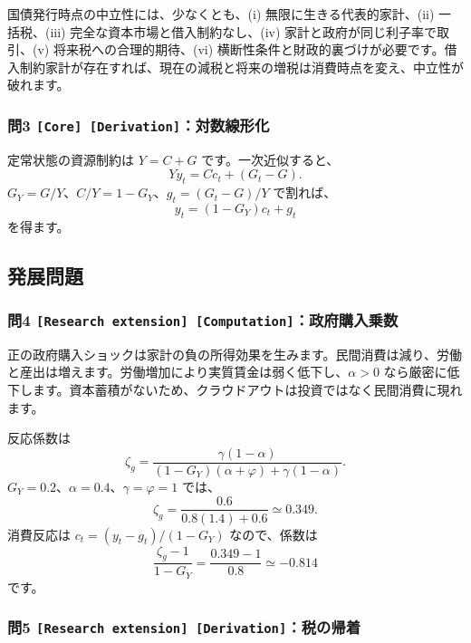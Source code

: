 \documentclass[
  japanese,
  lualatex,
  ja=standard,
  11pt,
  a4paper]{ltjsarticle}
\begin{document}
国債発行時点の中立性には、少なくとも、(i) 無限に生きる代表的家計、(ii)
一括税、(iii) 完全な資本市場と借入制約なし、(iv)
家計と政府が同じ利子率で取引、(v) 将来税への合理的期待、(vi)
横断性条件と財政的裏づけが必要です。借入制約家計が存在すれば、現在の減税と将来の増税は消費時点を変え、中立性が破れます。

\subsubsection{\texorpdfstring{問3
\texttt{{[}Core{]}\ {[}Derivation{]}}：対数線形化}{問3 {[}Core{]} {[}Derivation{]}：対数線形化}}\label{ux554f3-core-derivationux5bfeux6570ux7ddaux5f62ux5316}

定常状態の資源制約は \(Y=C+G\) です。一次近似すると、 \[
Yy_t=Cc_t+(G_t-G).
\] \(G_Y=G/Y\)、\(C/Y=1-G_Y\)、\(g_t=(G_t-G)/Y\) で割れば、 \[
y_t=(1-G_Y)c_t+g_t
\] を得ます。

\subsection{発展問題}\label{ux767aux5c55ux554fux984c-4}

\subsubsection{\texorpdfstring{問4
\texttt{{[}Research\ extension{]}\ {[}Computation{]}}：政府購入乗数}{問4 {[}Research extension{]} {[}Computation{]}：政府購入乗数}}\label{ux554f4-research-extension-computationux653fux5e9cux8cfcux5165ux4e57ux6570}

正の政府購入ショックは家計の負の所得効果を生みます。民間消費は減り、労働と産出は増えます。労働増加により実質賃金は弱く低下し、\(\alpha>0\)
なら厳密に低下します。資本蓄積がないため、クラウドアウトは投資ではなく民間消費に現れます。

反応係数は \[
\zeta_g
=\frac{\gamma(1-\alpha)}{(1-G_Y)(\alpha+\varphi)+\gamma(1-\alpha)}.
\] \(G_Y=0.2\)、\(\alpha=0.4\)、\(\gamma=\varphi=1\) では、 \[
\zeta_g=\frac{0.6}{0.8(1.4)+0.6}\simeq0.349.
\] 消費反応は \(c_t=(y_t-g_t)/(1-G_Y)\) なので、係数は \[
\frac{\zeta_g-1}{1-G_Y}
=\frac{0.349-1}{0.8}\simeq-0.814
\] です。

\subsubsection{\texorpdfstring{問5
\texttt{{[}Research\ extension{]}\ {[}Derivation{]}}：税の帰着}{問5 {[}Research extension{]} {[}Derivation{]}：税の帰着}}\label{ux554f5-research-extension-derivationux7a0eux306eux5e30ux7740}
\end{document}
